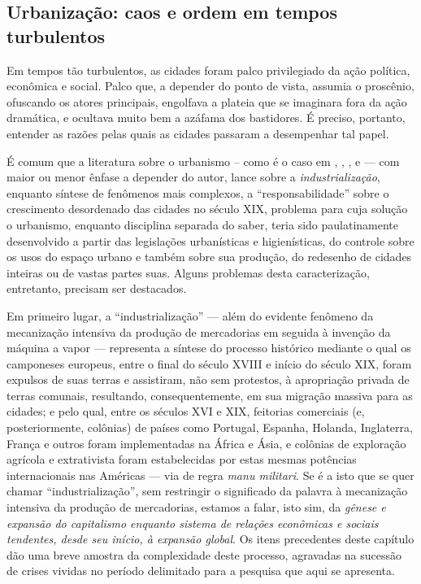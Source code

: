 \subsection{Urbanização: caos e ordem em tempos turbulentos}\label{subsec:urbanizacaos}

Em tempos tão turbulentos, as cidades foram palco privilegiado da ação política, econômica e social. Palco que, a depender do ponto de vista, assumia o proscênio, ofuscando os atores principais, engolfava a plateia que se imaginara fora da ação dramática, e ocultava muito bem a azáfama dos bastidores. É preciso, portanto, entender as razões pelas quais as cidades passaram a desempenhar tal papel.

É comum que a literatura sobre o urbanismo -- como é o caso em , , ,  e  --- com maior ou menor ênfase a depender do autor, lance sobre a \textit{industrialização}, enquanto síntese de fenômenos mais complexos, a ``responsabilidade'' sobre o crescimento desordenado das cidades no século XIX, problema para cuja solução o urbanismo, enquanto disciplina separada do saber, teria sido paulatinamente desenvolvido a partir das legislações urbanísticas e higienísticas, do controle sobre os usos do espaço urbano e também sobre sua produção, do redesenho de cidades inteiras ou de vastas partes suas. Alguns problemas desta caracterização, entretanto, precisam ser destacados.

Em primeiro lugar, a ``industrialização'' --- além do evidente fenômeno da mecanização intensiva da produção de mercadorias em seguida à invenção da máquina a vapor --- representa a síntese do processo histórico mediante o qual os camponeses europeus, entre o final do século XVIII e início do século XIX, foram expulsos de suas terras e assistiram, não sem protestos, à apropriação privada de terras comunais, resultando, consequentemente, em sua migração massiva para as cidades; e pelo qual, entre os séculos XVI e XIX, feitorias comerciais (e, posteriormente, colônias) de países como Portugal, Espanha, Holanda, Inglaterra, França e outros foram implementadas na África e Ásia, e colônias de exploração agrícola e extrativista foram estabelecidas por estas mesmas potências internacionais nas Américas --- via de regra \textit{manu militari}. Se é a isto que se quer chamar ``industrialização'', sem restringir o significado da palavra à mecanização intensiva da produção de mercadorias, estamos a falar, isto sim, da \textit{gênese e expansão do capitalismo enquanto sistema de relações econômicas e sociais tendentes, desde seu início, à expansão global}. Os itens precedentes deste capítulo dão uma breve amostra da complexidade deste processo, agravadas na sucessão de crises vividas no período delimitado para a pesquisa que aqui se apresenta.


